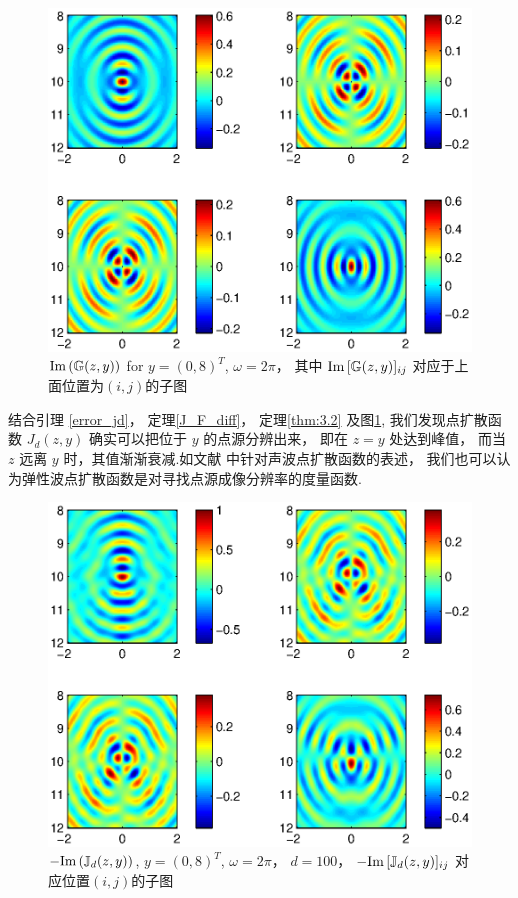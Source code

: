 \begin{figure}[htbp]
	\centering
	\includegraphics[width=\textwidth]{./Img/graphic/green_om_2_lm_5_mu_25_im.eps}	
	\caption{$\mathrm{Im}\,(\mathbb{G}(z,y))$ for $y=(0,8)^T$, $\omega=2\pi$， 其中 $\mathrm{Im}\, [\mathbb{G}(z,y)]_{ij}$ 对应于上面位置为$(i,j)$的子图}\label{figure_psf}
\end{figure}

结合引理 \ref{error_jd}， 定理\ref{J_F_diff}， 定理\ref{thm:3.2} 及图\ref{figure_psf}, 我们发现点扩散函数 $J_d(z,y)$ 确实可以把位于 $y$ 的点源分辨出来， 即在 $z=y$ 处达到峰值， 而当 $z$ 远离 $y$ 时，其值渐渐衰减.如文献 \cite{RTMhalf_aco} 中针对声波点扩散函数的表述， 我们也可以认为弹性波点扩散函数是对寻找点源成像分辨率的度量函数.

\begin{figure}[htbp]
	\centering
	\includegraphics[width=\textwidth]{./Img/graphic/psf_om_2_lm_5_mu_25_im.eps}	
	\caption{$-\mathrm{Im}\,(\mathbb{J}_d(z,y))$, $y=(0,8)^T$, $\omega=2\pi$， $d=100$， $-\mathrm{Im}\, [\mathbb{J}_d(z,y)]_{ij}$ 对应位置$(i,j)$的子图 }\label{figure_green}
\end{figure}

